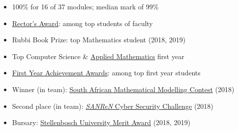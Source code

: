 \documentclass[10pt,a4paper,ragged2e,academicons]{altacv}
\begin{document}
\begin{itemize}
    \item 100\% for 16 of 37 modules; median mark of 99\%
    \item \href{https://www.sun.ac.za/english/Lists/news/DispForm.aspx?ID=7717}{Rector's Award}: among top students of faculty
    \item Rubbi Book Prize: top Mathematics student (2018, 2019)
    \item Top Computer Science \& \href{https://appliedmaths.sun.ac.za/topachievers.html}{Applied Mathematics} first year
    \item \href{https://www.sun.ac.za/english/learning-teaching/ctl/t-l-awards-and-grants/first-years-prestige-dinner}{First Year Achievement Awards}: among top first year students
    \item Winner (in team): \href{https://appliedmaths.sun.ac.za/sammc.html}{South African Mathematical Modelling Contest} (2018)
    \item Second place (in team): \href{https://www.csc.ac.za/?page_id=665}{\emph{SANReN} Cyber Security Challenge} (2018)
    \item Bursary: \href{https://finaid.sun.ac.za/merit-bursary}{Stellenbosch University Merit Award} (2018, 2019)
\end{itemize}
\end{document}
